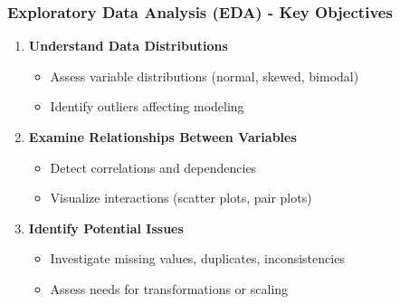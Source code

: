 \documentclass[aspectratio=169]{beamer}
\begin{document}
\begin{frame}[fragile]
    \frametitle{Exploratory Data Analysis (EDA) - Key Objectives}
    \begin{enumerate}
        \item \textbf{Understand Data Distributions}
        \begin{itemize}
            \item Assess variable distributions (normal, skewed, bimodal)
            \item Identify outliers affecting modeling
        \end{itemize}
        
        \item \textbf{Examine Relationships Between Variables}
        \begin{itemize}
            \item Detect correlations and dependencies
            \item Visualize interactions (scatter plots, pair plots)
        \end{itemize}
        
        \item \textbf{Identify Potential Issues}
        \begin{itemize}
            \item Investigate missing values, duplicates, inconsistencies
            \item Assess needs for transformations or scaling
        \end{itemize}
    \end{enumerate}
\end{frame}
\end{document}
